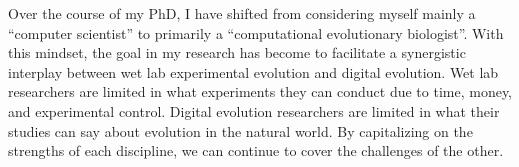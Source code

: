 Over the course of my PhD, I have shifted from considering myself mainly a ``computer scientist'' to primarily a ``computational evolutionary biologist''. 
With this mindset, the goal in my research has become to facilitate a synergistic interplay between wet lab experimental evolution and digital evolution. 
Wet lab researchers are limited in what experiments they can conduct due to time, money, and experimental control. 
Digital evolution researchers are limited in what their studies can say about evolution in the natural world. 
By capitalizing on the strengths of each discipline, we can continue to cover the challenges of the other. 
